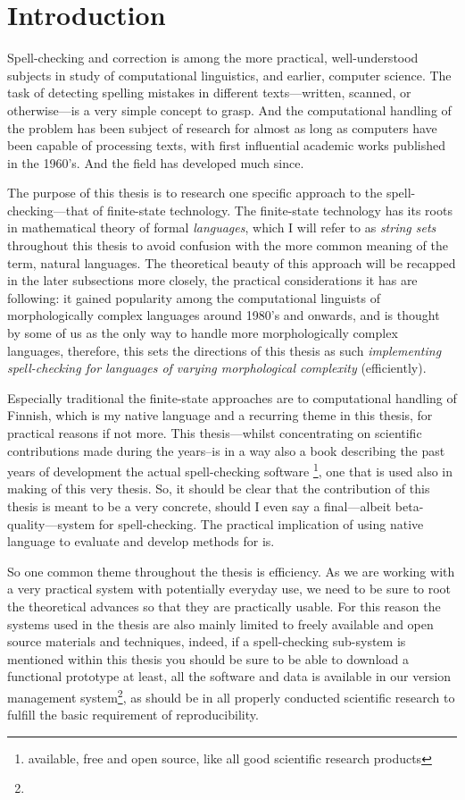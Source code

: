 \documentclass[officiallayout,draft]{unihelcompling}
\begin{document}
\chapter{Introduction}
\label{chap:introduction}

Spell-checking and correction is among the more practical, well-understood
subjects in study of computational linguistics, and earlier, computer science.
The task of detecting spelling mistakes in different texts---written, scanned,
or otherwise---is a very simple concept to grasp. And the computational
handling of the problem has been subject of research for almost as long as
computers have been capable of processing texts, with first influential
academic works published in the 1960's. And the field has developed much since.

The purpose of this thesis is to research one specific approach to the
spell-checking---that of finite-state technology. The finite-state technology
has its roots in mathematical theory of formal \emph{languages}, which I will
refer to as \emph{string sets} throughout this thesis to avoid confusion with
the more common meaning of the term, natural languages. The theoretical beauty
of this approach will be recapped in the later subsections more closely, the
practical considerations it has are following: it gained popularity among the
computational linguists of morphologically complex languages around 1980's and
onwards, and is thought by some of us as the only way to handle more
morphologically complex languages, therefore, this sets the directions of this
thesis as such \emph{implementing spell-checking for languages of varying
morphological complexity} (efficiently). 

Especially traditional the finite-state approaches are to computational
handling of Finnish, which is my native language and a recurring theme in this
thesis, for practical reasons if not more. This thesis---whilst concentrating on
scientific contributions made during the years--is in a way also a book 
describing the past years of development the actual spell-checking software
\footnote{available, free and open source, like all good
scientific research products}, one that is used also in making of this very
thesis. So, it should be clear that the contribution of this thesis is meant
to be a very concrete, should I even say a final---albeit beta-quality---system
for spell-checking. The practical implication of using native language to
evaluate and develop methods for is.

So one common theme throughout the thesis is efficiency. As we are working with
a very practical system with potentially everyday use, we need to be sure to
root the theoretical advances so that they are practically usable. For this
reason the systems used in the thesis are also mainly limited to freely
available and open source materials and techniques, indeed, if a spell-checking
sub-system is mentioned within this thesis you should be sure to be able to
download a functional prototype at least, all the software and data is
available in our version management system\footnote{}, as should be in all
properly conducted scientific research to fulfill the basic requirement of
reproducibility.
\end{document}
